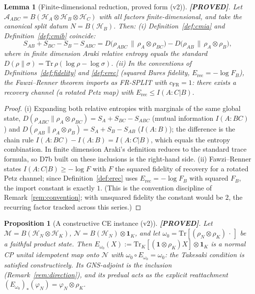 \documentclass[11pt]{article}
\newtheorem{lemma}[theorem]{Lemma}
\newtheorem{proposition}[theorem]{Proposition}
\theoremstyle{definition}
\theoremstyle{remark}
\newcommand{\PROVED}{\textcolor{green!60!black}{\textbf{[PROVED]}}}
\newcommand{\Erec}{E_{\mathrm{rec}}}
\newcommand{\cA}{\mathcal{A}}
\newcommand{\cN}{\mathcal{N}}
\newcommand{\cM}{\mathcal{M}}
\begin{document}
\begin{lemma}[Finite-dimensional reduction, proved form (v2)]
\label{lem:findim}
\PROVED. Let $\cA_{ABC} = B(\mathcal{H}_A \otimes \mathcal{H}_B \otimes
\mathcal{H}_C)$ with all factors finite-dimensional, and take the
canonical split datum $N = B(\mathcal{H}_B)$. Then: (i)
Definition~\ref{def:cmia} and Definition~\ref{def:cmib} coincide:
\[
S_{AB} + S_{BC} - S_B - S_{ABC}
= D\bigl(\rho_{ABC} \,\|\, \rho_A \otimes \rho_{BC}\bigr)
- D\bigl(\rho_{AB} \,\|\, \rho_A \otimes \rho_B\bigr),
\]
where in finite dimension Araki relative entropy equals the standard
$D(\rho\|\sigma) = \mathrm{Tr}\,\rho(\log\rho - \log\sigma)$. (ii) In
the conventions of Definitions~\ref{def:fidelity} and \ref{def:erec}
(squared Bures fidelity, $\Erec = -\log F_B$), the Fawzi--Renner theorem
\cite{FR} imports as FR-SPLIT with $c_{\mathrm{FR}} = 1$: there exists a
recovery channel (a rotated Petz map) with
$\Erec \le I(A:C|B)$.
\end{lemma}

\begin{proof}
(i) Expanding both relative entropies with marginals of the same global
state, $D(\rho_{ABC}\|\rho_A \otimes \rho_{BC}) = S_A + S_{BC} -
S_{ABC}$ (mutual information $I(A:BC)$) and $D(\rho_{AB}\|\rho_A \otimes
\rho_B) = S_A + S_B - S_{AB}$ ($I(A:B)$); the difference is the chain
rule $I(A:BC) - I(A:B) = I(A:C|B)$, which equals the entropy
combination. In finite dimension Araki's definition reduces to the
standard trace formula, so D7b built on these inclusions is the
right-hand side. (ii) Fawzi--Renner \cite{FR} states $I(A:C|B) \ge
-\log F$ with $F$ the squared fidelity of recovery for a rotated Petz
channel; since Definition~\ref{def:erec} uses $\Erec = -\log F_B$ with
squared $F_B$, the import constant is exactly $1$. (This is the
convention discipline of Remark~\ref{rem:convention}; with unsquared
fidelity the constant would be $2$, the recurring factor tracked across
this series.)
\end{proof}

\begin{proposition}[A constructive CE instance (v2)]
\label{prop:ce}
\PROVED. Let $\cM = B(\mathcal{H}_N \otimes \mathcal{H}_K)$, $\cN =
B(\mathcal{H}_N) \otimes \mathbf{1}_K$, and let $\omega_0 =
\mathrm{Tr}[(\rho_N \otimes \rho_K)\,\cdot\,]$ be a faithful product
state. Then $E_{\omega_0}(X) := \mathrm{Tr}_K[(\mathbf{1} \otimes
\rho_K) X] \otimes \mathbf{1}_K$ is a normal CP unital idempotent map
onto $\cN$ with $\omega_0 \circ E_{\omega_0} = \omega_0$: the Takesaki
condition is satisfied constructively. Its GNS-adjoint is the inclusion
(Remark~\ref{rem:direction}), and its predual acts as the explicit
reattachment $(E_{\omega_0})_*(\varphi_N) = \varphi_N \otimes \rho_K$.
\end{proposition}
\end{document}
